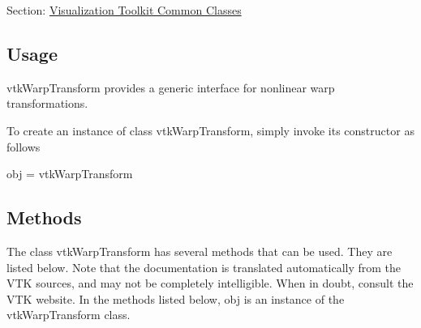 Section\-: \hyperlink{sec_vtkcommon}{Visualization Toolkit Common Classes} \hypertarget{vtkwidgets_vtkxyplotwidget_Usage}{}\subsection{Usage}\label{vtkwidgets_vtkxyplotwidget_Usage}
vtk\-Warp\-Transform provides a generic interface for nonlinear warp transformations.

To create an instance of class vtk\-Warp\-Transform, simply invoke its constructor as follows \begin{DoxyVerb}  obj = vtkWarpTransform
\end{DoxyVerb}
 \hypertarget{vtkwidgets_vtkxyplotwidget_Methods}{}\subsection{Methods}\label{vtkwidgets_vtkxyplotwidget_Methods}
The class vtk\-Warp\-Transform has several methods that can be used. They are listed below. Note that the documentation is translated automatically from the V\-T\-K sources, and may not be completely intelligible. When in doubt, consult the V\-T\-K website. In the methods listed below, {\ttfamily obj} is an instance of the vtk\-Warp\-Transform class. 
